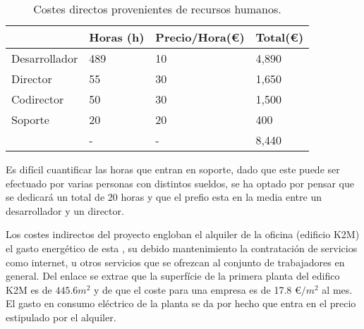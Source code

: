 \begin{table}[H]
\begin{tabular}{l|l|l|l|}
\cline{2-4}
                                                    & Horas (h) & Precio/Hora(\euro) & Total(\euro) \\ \hline
\multicolumn{1}{|l|}{Desarrollador}                 & 489       & 10               & 4,890     \\ \hline
\multicolumn{1}{|l|}{Director}                      & 55        & 30               & 1,650     \\ \hline
\multicolumn{1}{|l|}{Codirector}                    & 50        & 30               & 1,500     \\ \hline
\multicolumn{1}{|l|}{Soporte}                       & 20        & 20               & 400      \\ \hline
\rowcolor{gray!50}
\multicolumn{1}{|l|}{Total} &    -       &  -              &  8,440        \\ \hline
\end{tabular}
\caption{Costes directos provenientes de recursos humanos.}
\end{table}

Es difícil cuantificar las horas que entran en soporte, dado que este puede ser efectuado por varias personas con distintos sueldos, se ha optado por pensar que se dedicará un total de 20 horas y que el prefio esta en la media entre un desarrollador y un director.

\par\bigskip

Los costes indirectos del proyecto engloban el alquiler de la oficina (edificio K2M) el gasto energético de esta , su debido mantenimiento la contratación de servicios como internet, u otros servicios que se ofrezcan al conjunto de trabajadores en general. Del enlace \cite{k2msuperficie} se extrae que la superfície de la primera planta del edifico K2M es de $445.6 m^{2}$ y de \cite{k2mpreu} que el coste para una empresa es de 17.8 \euro$/m^{2}$ al mes. El gasto en consumo eléctrico de la planta se da por hecho que entra en el precio estipulado por el alquiler.

